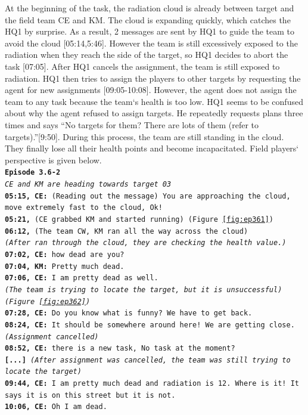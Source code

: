 At the beginning of the task, the radiation cloud is already between target and the field team CE and KM. The cloud is expanding quickly, which catches the HQ1 by surprise. As a result, 2 messages are sent by HQ1 to guide the team to avoid the cloud [05:14,5:46]. However the team is still excessively exposed to the radiation when they reach the side of the target, so HQ1 decides to abort the task [07:05]. After HQ1 cancels the assignment, the team is still exposed to radiation. HQ1 then tries to assign the players to other targets by requesting the agent for new assignments [09:05-10:08]. However, the agent does not assign the team to any task because the team`s health is too low. HQ1 seems to be confused about why the agent refused to assign targets. He repeatedly requests plans three times and says ``No targets for them? There are lots of them (refer to targets).''[9:50]. During this process, the team are still standing in the cloud. They finally lose all their health points and become incapacitated. Field players` perspective is given below. \\


\noindent\texttt{\textbf{Episode 3.6-2}\\
\emph{CE and KM are heading towards target 03}\\
\textbf{05:15, CE: } (Reading out the message) You are approaching the cloud, move extremely fast to the cloud, Ok! \\
\textbf{05:21,} (CE grabbed KM and started running) (Figure \ref{fig:ep361})\\
\textbf{06:12,} (The team CW, KM ran all the way across the cloud) \\
\emph{(After ran through the cloud, they are checking the health value.)}\\
\textbf{07:02, CE: } how dead are you?\\
\textbf{07:04, KM: } Pretty much dead.\\
\textbf{07:06, CE: } I am pretty dead as well.\\
\emph{(The team is trying to locate the target, but it is unsuccessful) (Figure \ref{fig:ep362})}\\
\textbf{07:28, CE: } Do you know what is funny? We have to get back.\\
\textbf{08:24, CE: } It should be somewhere around here! We are getting close.\\
\emph{(Assignment cancelled)}\\
\textbf{08:52, CE: } there is a new task, No task at the moment? \\
\textbf{[...]} 
\emph{(After assignment was cancelled, the team was still trying to locate the target)}\\
\textbf{09:44, CE: } I am pretty much dead and radiation is 12. Where is it! It says it is on this street but it is not. \\
\textbf{10:06, CE: } Oh I am dead.\\
}

